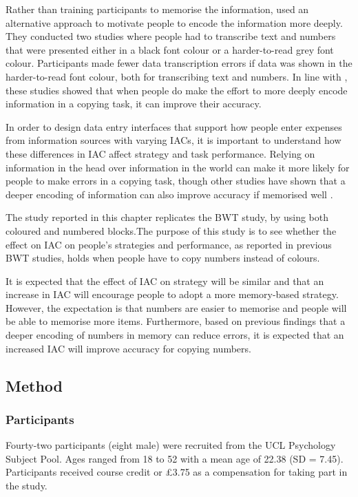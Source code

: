 Rather than training participants to memorise the information, \citet{Soboczenski2013} used an alternative approach to motivate people to encode the information more deeply. They conducted two studies where people had to transcribe text and numbers that were presented either in a black font colour or a harder-to-read grey font colour. Participants made fewer data transcription errors if data was shown in the harder-to-read font colour, both for transcribing text and numbers. In line with \citet{Gray2004}, these studies showed that when people do make the effort to more deeply encode information in a copying task, it can improve their accuracy.

In order to design data entry interfaces that support how people enter expenses from information sources with varying IACs, it is important to understand how these differences in IAC affect strategy and task performance. Relying on information in the head over information in the world can make it more likely for people to make errors in a copying task\citep{Morgan2009}, though other studies have shown that a deeper encoding of information can also improve accuracy if memorised well \citep{Gray2004, Soboczenski2013}. 

The study reported in this chapter replicates the BWT study, by using both coloured and numbered blocks.The purpose of this study is to see whether the effect on IAC on people's strategies and performance, as reported in previous BWT studies, holds when people have to copy numbers instead of colours.

It is expected that the effect of IAC on strategy will be similar and that an increase in IAC will encourage people to adopt a more memory-based strategy.  However, the expectation is that numbers are easier to memorise and people will be able to memorise more items. Furthermore, based on previous findings that a deeper encoding of numbers in memory can reduce errors, it is expected that an increased IAC will improve accuracy for copying numbers.


\subsection{Method}
\subsubsection{Participants}
Fourty-two participants (eight male) were recruited from the UCL Psychology Subject Pool. Ages ranged from 18 to 52 with a mean age of 22.38 (SD = 7.45). Participants received course credit or \pounds3.75 as a compensation for taking part in the study.

